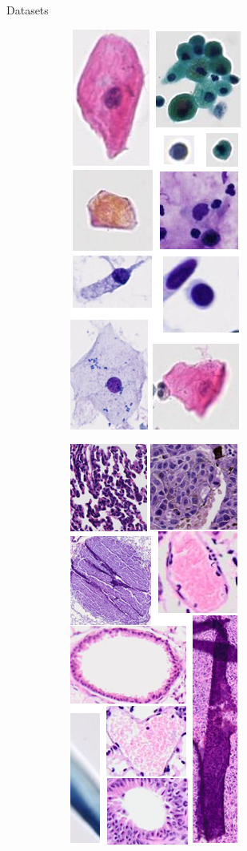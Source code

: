 \documentclass{beamer}
\begin{document}
\begin{frame}{Datasets}
\begin{figure}
    \begin{subfigure}{0.1\textwidth}\includegraphics[scale=0.35]{images/illus_anapath.png}\end{subfigure}
    \begin{subfigure}{0.1\textwidth}\includegraphics[scale=0.35]{images/illus_tissus.png}\end{subfigure}

\end{figure}
\end{frame}
\end{document}
